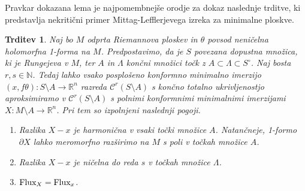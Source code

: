 \documentclass[12pt,a4paper,twoside]{article}
\theoremstyle{definition} %
\theoremstyle{plain} %
\newtheorem{trditev}[definicija]{Trditev}
\numberwithin{equation}{section}  %
\begin{document}
Pravkar dokazana lema je najpomembnejše orodje za dokaz naslednje trditve, ki predstavlja nekritični primer Mittag-Lefflerjevega izreka za minimalne ploskve.

\begin{trditev} \label{trd:ML-nekriticni-primer}
Naj bo $M$ odprta Riemannova ploskev in $\theta$ povsod neničelna holomorfna 1-forma na $M$. Predpostavimo, da je $S$ povezana dopustna množica, ki je Rungejeva v $M$, ter $A$ in $\Lambda$ končni množici točk z $A \subset \Lambda \subset S^{\circ}$. Naj bosta $r, s \in \mathbb{N}$.
Tedaj lahko vsako posplošeno konformno minimalno imerzijo $(x, f\theta) \colon S \setminus A \to \mathbb{R}^{n}$ razreda $\mathcal{C}^{r}(S\setminus A)$ s končno totalno ukrivljenostjo aproksimiramo v $\mathcal{C}^{r}(S \setminus A)$ s polnimi konformnimi minimalnimi imerzijami $X \colon M \setminus A \to \mathbb{R}^{n}$. Pri tem so izpolnjeni naslednji pogoji.
\begin{enumerate}
\item Razlika $X-x$ je harmonična v vsaki točki množice $A$. Natančneje, 1-formo $\partial X$ lahko meromorfno razširimo na $M$ s poli v točkah množice $A$.
\item Razlika $X-x$ je ničelna do reda $s$ v točkah množice $\Lambda$.
\item $\textup{Flux}_{X} = \textup{Flux}_{x}$.
\end{enumerate}
\end{trditev}
\end{document}
